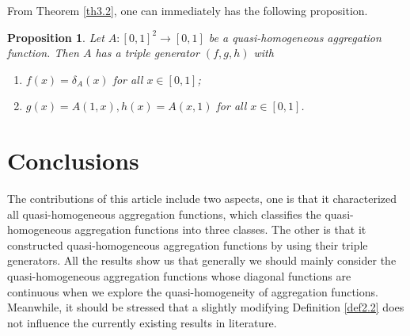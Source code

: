 \documentclass[12pt]{article}
\newtheorem{proposition}{\bf Proposition}[section]
\begin{document}
From Theorem \ref{th3.2}, one can immediately has the following proposition.
\begin{proposition}\label{prop5.2}
Let $A:[0, 1]^2 \rightarrow[0, 1]$ be a quasi-homogeneous aggregation function. Then $A$ has a triple generator $(f,g, h)$ with
 \begin{enumerate}
\item [(1)] $f(x)=\delta_{A}(x)$ for all $x\in[0, 1]$;
\item [(2)] $g(x)=A(1, x), h(x)=A(x, 1)$ for all $x\in[0, 1]$.
\end{enumerate}
\end{proposition}


\section{Conclusions}

 The contributions of this article include two aspects, one is that it characterized all quasi-homogeneous aggregation functions, which classifies the quasi-homogeneous aggregation functions into three classes. The other is that it constructed quasi-homogeneous aggregation functions by using their triple generators. All the results show us that generally we should mainly consider the quasi-homogeneous aggregation functions whose diagonal functions are continuous when we explore the quasi-homogeneity of aggregation functions. Meanwhile, it should be stressed that a slightly modifying Definition \ref{def2.2} does not influence the currently existing results in literature.
\end{document}
